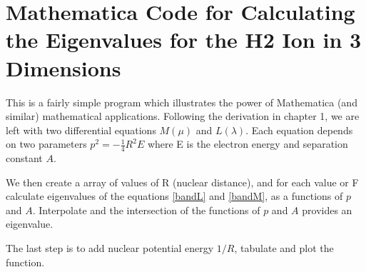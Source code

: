 \chapter{Mathematica Code for Calculating the Eigenvalues for the H2 Ion in 3 Dimensions}
\label{AppendixB}

This is a fairly simple program which illustrates the power of Mathematica (and similar) mathematical applications. Following the derivation in chapter 1, we are left with two differential equations $ M(\mu) $ and $ L(\lambda) $. Each equation depends on  two parameters $ p^2 = -\frac{1}{4}R^2E $ where E is the electron energy and separation constant $ A $.

We then create a array of values of R (nuclear distance), and for each value or F calculate eigenvalues of the equations \eqref{bandL} and  \eqref{bandM}, as a functions of $ p $ and $ A $. Interpolate and the intersection of the functions of $ p $ and $ A $ provides an eigenvalue.

The last step is to add nuclear potential energy $ 1/R $, tabulate and plot the function.

\begingroup
\scriptsize
%

\endgroup
